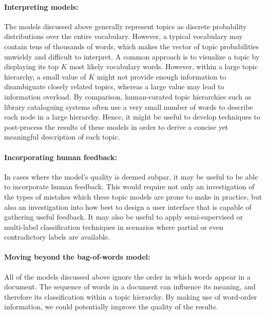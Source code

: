 \documentclass{article}
\begin{document}
\paragraph{Interpreting models:}
The models discussed above generally represent topics as discrete probability distributions over the entire vocabulary.
However, a typical vocabulary may contain tens of thousands of words, which makes the vector of topic probabilities unwieldy and difficult to interpret.
A common approach is to visualize a topic by displaying its top $K$ most likely vocabulary words.
However, within a large topic hierarchy, a small value of $K$ might not provide enough information to disambiguate closely related topics, whereas a large value may lead to information overload.
By comparison, human-curated topic hierarchies such as library cataloguing systems often use a very small number of words to describe each node in a large hierarchy.
Hence, it might be useful to develop techniques to post-process the results of these models in order to derive a concise yet meaningful description of each topic.

\paragraph{Incorporating human feedback:}
In cases where the model's quality is deemed subpar, it may be useful to be able to incorporate human feedback.
This would require not only an investigation of the types of mistakes which these topic models are prone to make in practice, but also an investigation into how best to design a user interface that is capable of gathering useful feedback.
It may also be useful to apply semi-supervised or multi-label classification techniques in scenarios where partial or even contradictory labels are available.

\paragraph{Moving beyond the bag-of-words model:}
All of the models discussed above ignore the order in which words appear in a document.
The sequence of words in a document can influence its meaning, and therefore its classification within a topic hierarchy.
By making use of word-order information, we could potentially improve the quality of the results.
\end{document}
